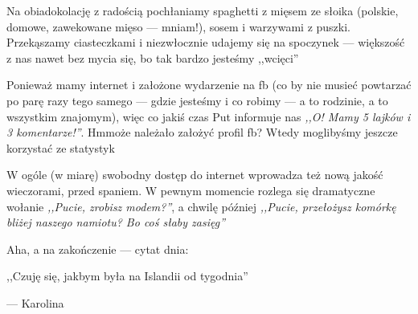 

Na obiadokolację z radością pochłaniamy spaghetti z mięsem ze słoika (polskie, domowe, zawekowane mięso --- mniam!), sosem i warzywami z puszki. Przekąszamy ciasteczkami i niezwłocznie udajemy się na spoczynek --- większość z nas nawet bez mycia się, bo tak bardzo jesteśmy ,,wcięci''\textellipsis


Ponieważ mamy internet i założone wydarzenie na fb (co by nie musieć powtarzać po parę razy tego samego --- gdzie jesteśmy i co robimy --- a to rodzinie, a to wszystkim znajomym), więc co jakiś czas Put informuje nas \emph{,,O! Mamy 5 lajków i 3 komentarze!''}. Hm\textellipsis może należało założyć profil fb? Wtedy moglibyśmy jeszcze korzystać ze statystyk\textellipsis

W ogóle (w miarę) swobodny dostęp do internet wprowadza też nową jakość wieczorami, przed spaniem. W pewnym momencie rozlega się dramatyczne wołanie \emph{,,Pucie, zrobisz modem?''}, a chwilę później \emph{,,Pucie, przełożysz komórkę bliżej naszego namiotu? Bo coś słaby zasięg\textellipsis''}

\vspace{16pt}

Aha, a na zakończenie --- cytat dnia:
\epigraph{,,Czuję się, jakbym była na Islandii od tygodnia\textellipsis''}{--- \textup{Karolina}}

